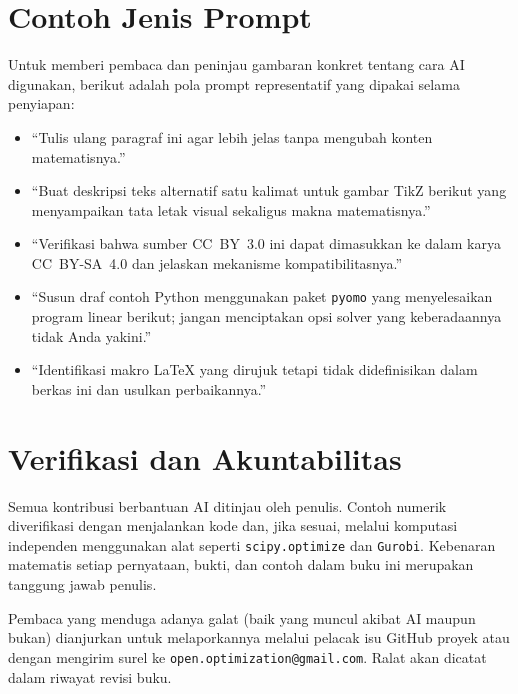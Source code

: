 \section*{Contoh Jenis Prompt}

Untuk memberi pembaca dan peninjau gambaran konkret tentang cara AI
digunakan, berikut adalah pola prompt representatif yang dipakai selama
penyiapan:

\begin{itemize}
  \item ``Tulis ulang paragraf ini agar lebih jelas tanpa mengubah
    konten matematisnya.''
  \item ``Buat deskripsi teks alternatif satu kalimat untuk gambar TikZ
    berikut yang menyampaikan tata letak visual sekaligus makna
    matematisnya.''
  \item ``Verifikasi bahwa sumber CC~BY~3.0 ini dapat dimasukkan ke dalam
    karya CC~BY-SA~4.0 dan jelaskan mekanisme kompatibilitasnya.''
  \item ``Susun draf contoh Python menggunakan paket \texttt{pyomo} yang
    menyelesaikan program linear berikut; jangan menciptakan opsi solver
    yang keberadaannya tidak Anda yakini.''
  \item ``Identifikasi makro LaTeX yang dirujuk tetapi tidak didefinisikan
    dalam berkas ini dan usulkan perbaikannya.''
\end{itemize}

\section*{Verifikasi dan Akuntabilitas}

Semua kontribusi berbantuan AI ditinjau oleh penulis. Contoh numerik
diverifikasi dengan menjalankan kode dan, jika sesuai, melalui komputasi
independen menggunakan alat seperti \texttt{scipy.optimize} dan
\texttt{Gurobi}. Kebenaran matematis setiap pernyataan, bukti, dan contoh
dalam buku ini merupakan tanggung jawab penulis.

Pembaca yang menduga adanya galat (baik yang muncul akibat AI maupun bukan)
dianjurkan untuk melaporkannya melalui pelacak isu GitHub proyek atau dengan
mengirim surel ke \texttt{open.optimization@gmail.com}. Ralat akan dicatat
dalam riwayat revisi buku.

